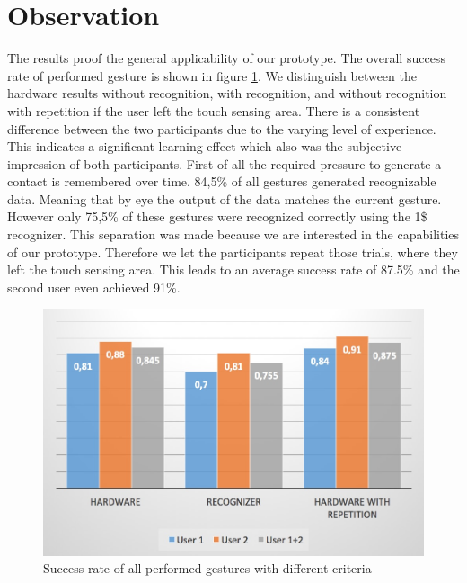 \section{Observation}
The results proof the general applicability of our prototype. The overall success rate of performed gesture is shown in figure \ref{fig:overallRecognition}. We distinguish between the hardware results without recognition, with recognition, and without recognition with repetition if the user left the touch sensing area. There is a consistent difference between the two participants due to the varying level of experience. This indicates a significant learning effect which also was the subjective impression of both participants. First of all the required pressure to generate a contact is remembered over time.  84,5\% of all gestures generated recognizable data. Meaning that by eye the output of the data matches the current gesture. However only 75,5\% of these gestures were recognized correctly using the 1\$ recognizer. This separation was made because we are interested in the capabilities of our prototype. Therefore we let the participants repeat those trials, where they  left the touch sensing area. This leads to an average success rate of 87.5\% and the second user even achieved 91\%.
\begin{figure}
\includegraphics[scale=0.3]{images/overallRecognition.jpg}
\caption{Success rate of all performed gestures with different criteria}
\label{fig:overallRecognition}
\end{figure}


